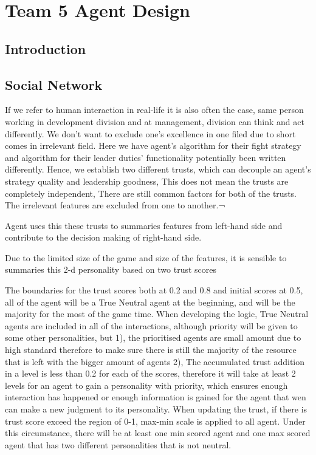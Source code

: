 \useunder{\uline}{\ul}{}
\chapter{Team 5 Agent Design}\label{team_5_agent_design}
\section{Introduction}


\section{Social Network}
If we refer to human interaction in real-life it is also often the case, same person working in development division and at management, division can think and act differently. 
We don’t want to exclude one’s excellence in one filed due to short comes in irrelevant field.
Here we have agent’s algorithm for their fight strategy and algorithm for their leader duties’ functionality potentially been written differently. 
Hence, we establish two different trusts, which can decouple an agent’s strategy quality and leadership goodness, 
This does not mean the trusts are completely independent, 
There are still common factors for both of the trusts.
The irrelevant features are excluded from one to another.¬

Agent uses this these trusts to summaries features from left-hand side and contribute to the decision making of right-hand side. 

Due to the limited size of the game and size of the features, it is sensible to summaries this 2-d personality based on two trust scores

The boundaries for the trust scores both at 0.2 and 0.8 and initial scores at 0.5, all of the agent will be a True Neutral agent at the beginning, and will be the majority for the most of the game time. When developing the logic, True Neutral agents are included in all of the interactions, although priority will be given to some other personalities, but 1), the prioritised agents are small amount due to high standard therefore to make sure there is still the majority of the resource that is left with the bigger amount of agents 2), The accumulated trust addition in a level is less than 0.2 for each of the scores, therefore it will take at least 2 levels for an agent to gain a personality with priority, which ensures enough interaction has happened or enough information is gained for the agent that wen can make a new judgment to its personality. When updating the trust, if there is trust score exceed the region of 0-1, max-min scale is applied to all agent. Under this circumstance, there will be at least one min scored agent and one max scored agent that has two different personalities that is not neutral. 

